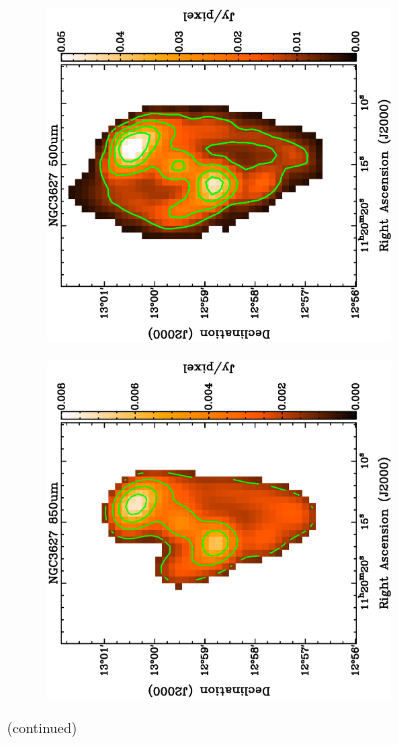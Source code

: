 \begin{figure}
  \ContinuedFloat 
  \begin{subfigure}[t]{0.48\textwidth}
    \centering
    \includegraphics[width=1.\textwidth,angle=270]{sed_imgs/500_sed.eps}
  \end{subfigure}
  \quad
  \begin{subfigure}[t]{0.48\textwidth}
    \centering
    \includegraphics[width=1.\textwidth,angle=270]{sed_imgs/850_sed.eps}
  \end{subfigure}
  \caption{(continued)}
\end{figure}

